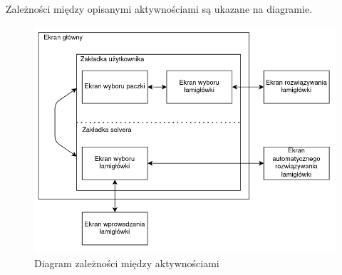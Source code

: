     Zależności między opisanymi aktywnościami są ukazane na diagramie.

\begin{figure}[!htb]
    \centering
    \includegraphics[width=\textwidth]{images/screens_diagram.png}
    \caption{Diagram zależności między aktywnościami}
\end{figure}
